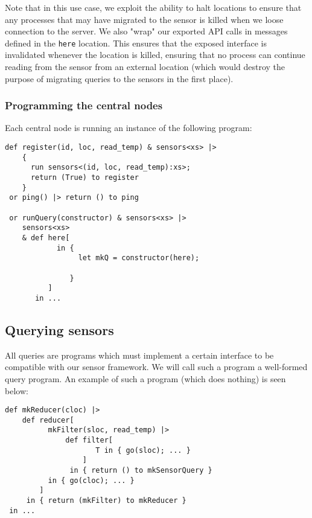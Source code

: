 Note that in this use case, we exploit the ability to halt
locations to ensure that any processes that may have migrated to
the sensor is killed when we loose connection to the server. We
also "wrap" our exported API calls in messages defined in the
\verb!here! location. This ensures that the exposed interface is
invalidated whenever the location is killed, ensuring that no
process can continue reading from the sensor from an external
location (which would destroy the purpose of migrating queries to
the sensors in the first place).

\subsubsection{Programming the central nodes}

Each central node is running an instance of the following program:

\begin{verbatim}
def register(id, loc, read_temp) & sensors<xs> |>
    {
      run sensors<(id, loc, read_temp):xs>;
      return (True) to register
    }
 or ping() |> return () to ping

 or runQuery(constructor) & sensors<xs> |>
    sensors<xs>
    & def here[
            in {
                 let mkQ = constructor(here);

               }
          ]
       in ...
\end{verbatim}


\subsection{Querying sensors}
\label{querying_sensors}

All queries are programs which must implement a certain interface to be
compatible with our sensor framework. We will call such a program a well-formed
query program. An example of such a program (which does nothing) is seen below:

\begin{verbatim}
def mkReducer(cloc) |>
    def reducer[
          mkFilter(sloc, read_temp) |>
              def filter[
                     T in { go(sloc); ... }
                  ]
               in { return () to mkSensorQuery }
          in { go(cloc); ... }
        ]
     in { return (mkFilter) to mkReducer }
 in ...
\end{verbatim}

